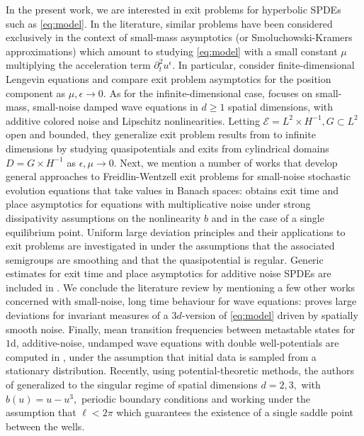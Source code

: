 \documentclass[10pt, reqno]{amsart}
\newcommand{\e}{\mathcal{E}}
\theoremstyle{definition}
\numberwithin{lem}{section}
\numberwithin{cor}{section}
\numberwithin{prop}{section}
\numberwithin{thm}{section}
\numberwithin{dfn}{section}
\begin{document}
   In the present work, we are interested in exit problems for hyperbolic SPDEs such as \eqref{eq:model}. In the literature, similar problems have been considered  exclusively in the context of small-mass asymptotics (or Smoluchowski-Kramers approximations) which  amount to studying \eqref{eq:model} with a small constant $\mu$ multiplying the acceleration term $\partial^2_t u^\epsilon$. In particular, \cite{chen2005smoluchowski, freidlin2004some} consider finite-dimensional Lengevin equations and compare exit problem asymptotics for the position component as $\mu,\epsilon\to 0.$ As for the infinite-dimensional case, \cite{cerrai2016smoluchowski} focuses on small-mass, small-noise damped wave equations in $d\geq 1$ spatial dimensions, with additive colored noise and Lipschitz nonlinearities. Letting $\e=L^2\times H^{-1}, G\subset L^2$ open and bounded, they  generalize exit problem results from \cite{chen2005smoluchowski} to infinite dimensions
   by studying quasipotentials and exits from cylindrical domains $D=G\times H^{-1}$ as $\epsilon,\mu\to0.$ Next, we mention a number of works that develop general approaches to Freidlin-Wentzell exit problems for small-noise stochastic evolution equations that take values in Banach spaces: \cite{salins2014general} obtains exit time and place asymptotics for equations with multiplicative noise under strong dissipativity assumptions on the nonlinearity $b$ and in the case of a single equilibrium point. Uniform large deviation principles and their applications to exit problems are investigated in \cite{salins2019uniform} under the assumptions that the associated semigroups are smoothing and that the quasipotential is regular. Generic estimates for exit time and place asymptotics for additive noise SPDEs are included in \cite[Chapter 12.5]{da2014stochastic}. We conclude the literature review by mentioning a few other works concerned with small-noise, long time behaviour for wave equations: \cite{martirosyan2017large} proves large deviations for invariant measures of a $3d$-version of \eqref{eq:model} driven by spatially smooth noise. Finally, mean transition frequencies between metastable states for $1$d, additive-noise, undamped wave equations with double well-potentials are computed in \cite{newhall2017metastability}, under the assumption that initial data is sampled from a stationary distribution. Recently, using potential-theoretic methods, the authors of \cite{barashkov2024eyring} generalized \cite{newhall2017metastability} to the singular regime of spatial dimensions $d=2,3,$ with $b(u)=u-u^3,$ periodic boundary conditions and working under the assumption that $\ell<2\pi$ which guarantees the existence of a single saddle point between the wells. 
\end{document}
